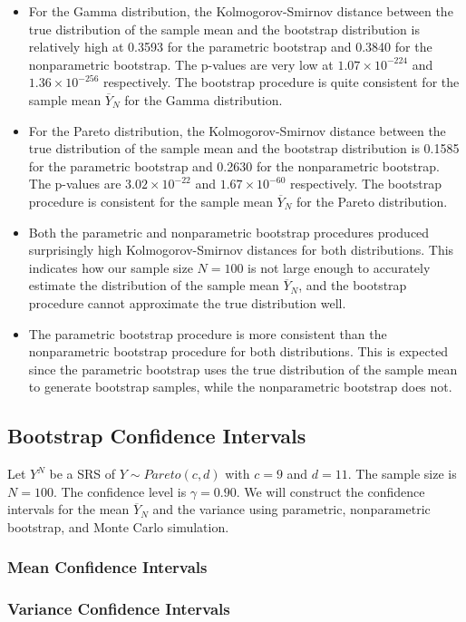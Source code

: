 \documentclass{article}
\begin{document}
\begin{itemize}
    \item For the Gamma distribution, the Kolmogorov-Smirnov distance between the true distribution of the sample mean and the bootstrap distribution is relatively high at 0.3593 for the parametric bootstrap and 0.3840 for the nonparametric bootstrap. The p-values are very low at \(1.07 \times 10^{-224}\) and \(1.36 \times 10^{-256}\) respectively. The bootstrap procedure is quite consistent for the sample mean \(\overline{Y}_N\) for the Gamma distribution.
    \item For the Pareto distribution, the Kolmogorov-Smirnov distance between the true distribution of the sample mean and the bootstrap distribution is 0.1585 for the parametric bootstrap and 0.2630 for the nonparametric bootstrap. The p-values are \(3.02 \times 10^{-22}\) and \(1.67 \times 10^{-60}\) respectively. The bootstrap procedure is consistent for the sample mean \(\overline{Y}_N\) for the Pareto distribution.
    \item Both the parametric and nonparametric bootstrap procedures produced surprisingly high Kolmogorov-Smirnov distances for both distributions. This indicates how our sample size \(N = 100\) is not large enough to accurately estimate the distribution of the sample mean \(\overline{Y}_N\), and the bootstrap procedure cannot approximate the true distribution well.
    \item The parametric bootstrap procedure is more consistent than the nonparametric bootstrap procedure for both distributions. This is expected since the parametric bootstrap uses the true distribution of the sample mean to generate bootstrap samples, while the nonparametric bootstrap does not.
\end{itemize}

\subsection{Bootstrap Confidence Intervals}

Let \(Y^N\) be a SRS of \(Y \sim Pareto(c, d)\) with \(c = 9\) and \(d = 11\). The sample size is \(N = 100\). The confidence level is \(\gamma = 0.90\). We will construct the confidence intervals for the mean \(\overline{Y}_N\) and the variance using parametric, nonparametric bootstrap, and Monte Carlo simulation.


\subsubsection{Mean Confidence Intervals}

\subsubsection{Variance Confidence Intervals}
\end{document}
